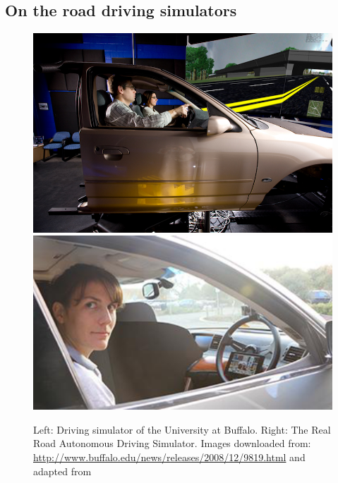 \subsection{On the road driving simulators}\label{ssec:simulator}
\begin{figure}
    \includegraphics[height=0.3\textwidth]{fig/simulator}\hfill\includegraphics[height=0.3\textwidth]{fig/rrads}
    \caption[Driving simulators]{Left: Driving simulator of the University at Buffalo. 
   Right: The Real Road Autonomous Driving Simulator. Images downloaded from: \url{http://www.buffalo.edu/news/releases/2008/12/9819.html} and adapted from \cite{Baltodano2015}}
    \label{fig:simulators}
\end{figure}
